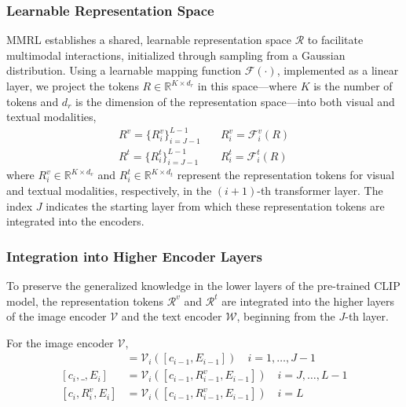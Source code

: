 \subsubsection{Learnable Representation Space}
MMRL establishes a shared, learnable representation space $\mathcal{R}$ to facilitate multimodal interactions, initialized through sampling from a Gaussian distribution. Using a learnable mapping function $\mathcal{F}(\cdot)$, implemented as a linear layer, we project the tokens $R \in \mathbb{R}^{K \times d_r}$ in this space—where $K$ is the number of tokens and $d_r$ is the dimension of the representation space—into both visual and textual modalities,
\begin{align}
    R^v = \{R_i^v\}_{i=J-1}^{L-1} \quad & R_i^v = \mathcal{F}_i^v(R) \nonumber \\ 
    R^t = \{R_i^t\}_{i=J-1}^{L-1} \quad & R_i^t = \mathcal{F}_i^t(R) \nonumber 
\end{align}
where $R_i^v \in \mathbb{R}^{K \times d_v}$ and $R_i^t \in \mathbb{R}^{K \times d_t}$ represent the representation tokens for visual and textual modalities, respectively, in the $(i+1)$-th transformer layer. The index $J$ indicates the starting layer from which these representation tokens are integrated into the encoders.


\subsubsection{Integration into Higher Encoder Layers}
To preserve the generalized knowledge in the lower layers of the pre-trained CLIP model, the representation tokens $\mathcal{R}^v$ and $\mathcal{R}^t$ are integrated into the higher layers of the image encoder $\mathcal{V}$ and the text encoder $\mathcal{W}$, beginning from the $J$-th layer.


For the image encoder $\mathcal{V}$,
\begin{align}
    [c_i, E_i] &= \mathcal{V}_i([c_{i-1}, E_{i-1}]) \quad i = 1, \ldots, J-1 \nonumber \\  
    [c_i, \_, E_i] &= \mathcal{V}_i([c_{i-1}, R_{i-1}^v, E_{i-1}]) \quad i = J, \ldots, L - 1 \nonumber \\
    [c_i, R_i^v, E_i] &= \mathcal{V}_i([c_{i-1}, R_{i-1}^v, E_{i-1}]) \quad i = L \nonumber
\end{align}

